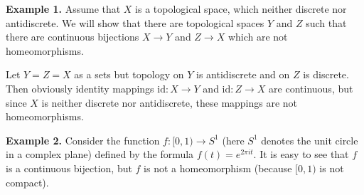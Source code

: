 \documentclass[12pt]{article}
\begin{document}
\textbf{Example 1.} Assume that $X$ is a topological space, which neither discrete nor antidiscrete. We will show that there are topological spaces $Y$ and $Z$ such that there are continuous bijections $X\to Y$ and $Z\to X$ which are not homeomorphisms.

Let $Y=Z=X$ as a sets but topology on $Y$ is antidiscrete and on $Z$ is discrete. Then obviously identity mappings $\mathrm{id}:X\to Y$ and $\mathrm{id}:Z\to X$ are continuous, but since $X$ is neither discrete nor antidiscrete, these mappings are not homeomorphisms.

\textbf{Example 2.} Consider the function $f:[0,1)\to S^1$ (here $S^1$ denotes the unit circle in a complex plane) defined by the formula $f(t)=e^{2\pi i t}$. It is easy to see that $f$ is a continuous bijection, but $f$ is not a homeomorphism (because $[0,1)$ is not compact).
\end{document}
